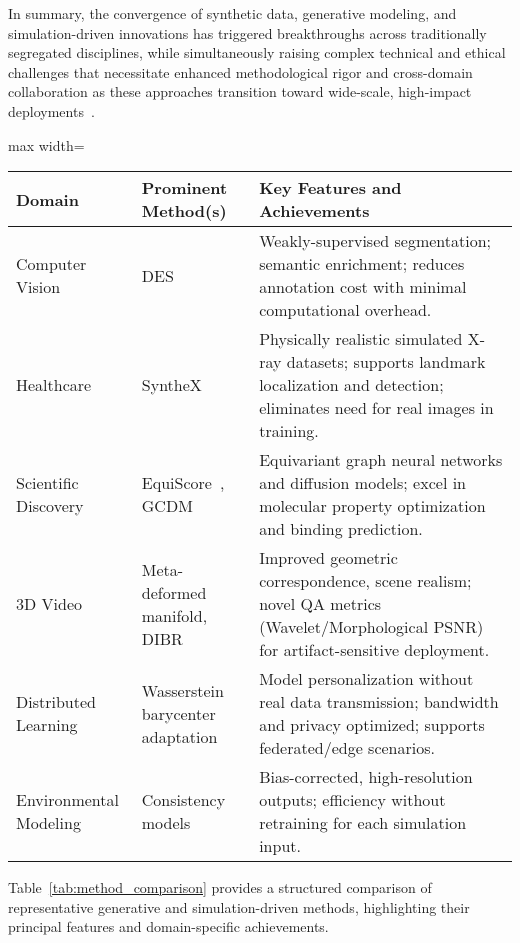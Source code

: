 In summary, the convergence of synthetic data, generative modeling, and simulation-driven innovations has triggered breakthroughs across traditionally segregated disciplines, while simultaneously raising complex technical and ethical challenges that necessitate enhanced methodological rigor and cross-domain collaboration as these approaches transition toward wide-scale, high-impact deployments~\cite{ref59,ref72,ref73,ref74}.

\begin{table*}[htbp]
\centering
\caption{Representative Generative and Simulation Methods in Selected Application Domains}
\label{tab:method_comparison}
\begin{adjustbox}{max width=\textwidth}
\begin{tabular}{lll}
\toprule
\textbf{Domain} & \textbf{Prominent Method(s)} & \textbf{Key Features and Achievements} \\
\midrule
Computer Vision & DES~\cite{ref61} & Weakly-supervised segmentation; semantic enrichment; reduces annotation cost with minimal computational overhead. \\
Healthcare & SyntheX~\cite{ref65} & Physically realistic simulated X-ray datasets; supports landmark localization and detection; eliminates need for real images in training. \\
Scientific Discovery & EquiScore~\cite{ref59}, GCDM~\cite{ref74} & Equivariant graph neural networks and diffusion models; excel in molecular property optimization and binding prediction. \\
3D Video & Meta-deformed manifold, DIBR~\cite{ref98,ref99} & Improved geometric correspondence, scene realism; novel QA metrics (Wavelet/Morphological PSNR) for artifact-sensitive deployment. \\
Distributed Learning & Wasserstein barycenter adaptation~\cite{ref72} & Model personalization without real data transmission; bandwidth and privacy optimized; supports federated/edge scenarios. \\
Environmental Modeling & Consistency models~\cite{ref73} & Bias-corrected, high-resolution outputs; efficiency without retraining for each simulation input. \\
\bottomrule
\end{tabular}
\end{adjustbox}
\end{table*}

Table~\ref{tab:method_comparison} provides a structured comparison of representative generative and simulation-driven methods, highlighting their principal features and domain-specific achievements.

